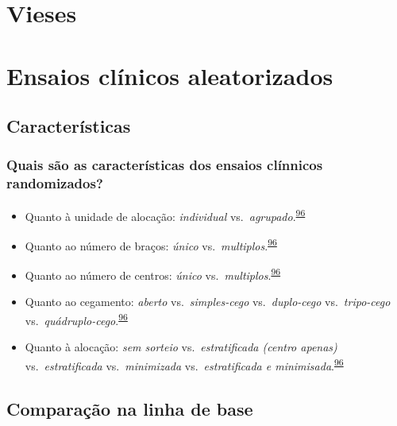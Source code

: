 \documentclass[
]{book}
\begin{document}
\hypertarget{vieses}{%
\chapter{\texorpdfstring{\textbf{Vieses}}{Vieses}}\label{vieses}}

\hypertarget{ensaios-cluxednicos-aleatorizados}{%
\chapter{\texorpdfstring{\textbf{Ensaios clínicos aleatorizados}}{Ensaios clínicos aleatorizados}}\label{ensaios-cluxednicos-aleatorizados}}

\hypertarget{caracteristicas}{%
\section{Características}\label{caracteristicas}}

\hypertarget{quais-suxe3o-as-caracteruxedsticas-dos-ensaios-cluxednnicos-randomizados}{%
\subsection{Quais são as características dos ensaios clínnicos randomizados?}\label{quais-suxe3o-as-caracteruxedsticas-dos-ensaios-cluxednnicos-randomizados}}

\begin{itemize}
\item
  Quanto à unidade de alocação: \emph{individual} vs.~\emph{agrupado}.\textsuperscript{\protect\hyperlink{ref-Bruce2022}{96}}
\item
  Quanto ao número de braços: \emph{único} vs.~\emph{multiplos}.\textsuperscript{\protect\hyperlink{ref-Bruce2022}{96}}
\item
  Quanto ao número de centros: \emph{único} vs.~\emph{multiplos}.\textsuperscript{\protect\hyperlink{ref-Bruce2022}{96}}
\item
  Quanto ao cegamento: \emph{aberto} vs.~\emph{simples-cego} vs.~\emph{duplo-cego} vs.~\emph{tripo-cego} vs.~\emph{quádruplo-cego}.\textsuperscript{\protect\hyperlink{ref-Bruce2022}{96}}
\item
  Quanto à alocação: \emph{sem sorteio} vs.~\emph{estratificada (centro apenas)} vs.~\emph{estratificada} vs.~\emph{minimizada} vs.~\emph{estratificada e minimisada}.\textsuperscript{\protect\hyperlink{ref-Bruce2022}{96}}
\end{itemize}

\hypertarget{comparacao-linha-de-base}{%
\section{Comparação na linha de base}\label{comparacao-linha-de-base}}
\end{document}
